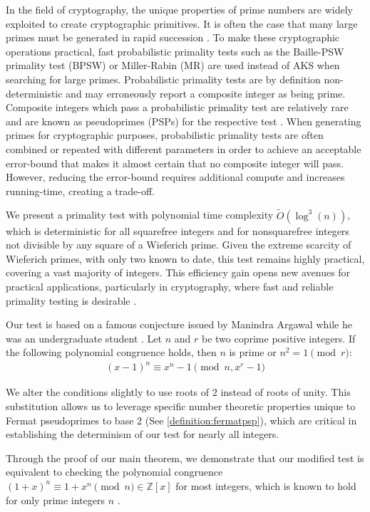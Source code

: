 \documentclass{article}
\theoremstyle{plain}
\theoremstyle{definition}
\newcommand{\softO}[1]{\tilde{O}(#1)}
\begin{document}
In the field of cryptography, the unique properties of prime numbers are widely exploited to create cryptographic primitives. It is often the case that many large primes must be generated in rapid succession \cite{lenstra1987}. To make these cryptographic operations practical, fast probabilistic primality tests such as the Baille-PSW primality test (BPSW) \cite{baillie1980} or Miller-Rabin (MR) \cite{rabin1980} \cite{miller1976} are used instead of AKS when searching for large primes. Probabilistic primality tests are by definition non-deterministic and may erroneously report a composite integer as being prime. Composite integers which pass a probabilistic primality test are relatively rare and are known as pseudoprimes (PSPs) for the respective test \cite{wagstaff1983}. When generating primes for cryptographic purposes, probabilistic primality tests are often combined or repeated with different parameters in order to achieve an acceptable error-bound that makes it almost certain that no composite integer will pass. However, reducing the error-bound requires additional compute and increases running-time, creating a trade-off.

We present a primality test with polynomial time complexity $\softO{\log^3(n)}$, which is deterministic for all squarefree integers and for nonsquarefree integers not divisible by any square of a Wieferich prime. Given the extreme scarcity of Wieferich primes, with only two known to date, this test remains highly practical, covering a vast majority of integers. This efficiency gain opens new avenues for practical applications, particularly in cryptography, where fast and reliable primality testing is desirable \cite{pomerance1984}.

Our test is based on a famous conjecture issued by Manindra Argawal while he was an undergraduate student \cite{aks2002}. Let $n$ and $r$ be two coprime positive integers. If the following polynomial congruence holds, then $n$ is prime or $n^2 = 1 \pmod{r}$:
\begin{align}
    (x - 1)^n \equiv x^n - 1 \pmod{n, x^r - 1}
\end{align}

We alter the conditions slightly to use roots of $2$ instead of roots of unity. This substitution allows us to leverage specific number theoretic properties unique to Fermat pseudoprimes to base $2$ (See \cref{definition:fermatpsp}), which are critical in establishing the determinism of our test for nearly all integers.

Through the proof of our main theorem, we demonstrate that our modified test is equivalent to checking the polynomial congruence $(1 + x)^n \equiv 1 + x^n \pmod{n} \in \mathbb{Z}[x]$ for most integers, which is known to hold for only prime integers $n$ \cite{granville2004primes}.
\end{document}
